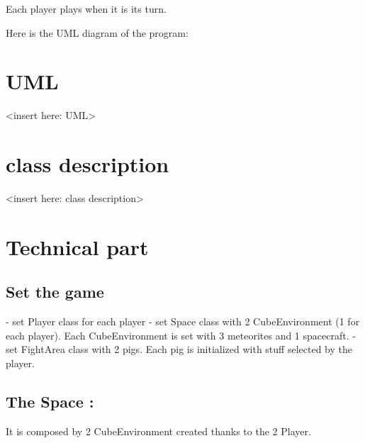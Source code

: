 Each player plays when it is its turn.

Here is the UML diagram of the program:

\section{UML}

<insert here: UML>

\section{class description}

<insert here: class description>

\section{Technical part}

\subsection{Set the game}

- set Player class for each player
- set Space class with 2 CubeEnvironment (1 for each player). Each CubeEnvironment is set with 3 meteorites and 1 spacecraft.
- set FightArea class with 2 pigs. Each pig is initialized with stuff selected by the player.


\subsection{The Space :}

It is composed by 2 CubeEnvironment created thanks to the 2 Player.

